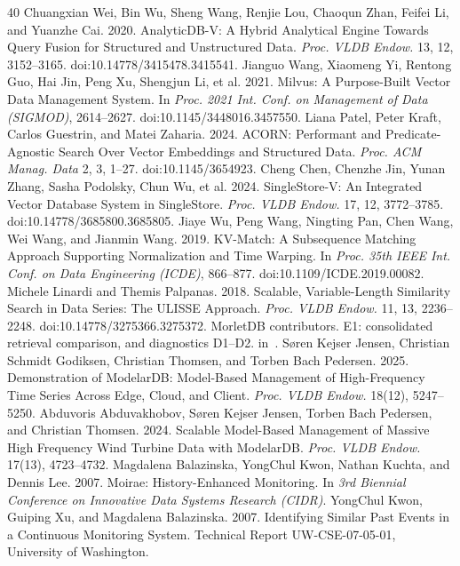 \documentclass[sigconf]{acmart}
\newcommand{\M}{MorletDB}
\begin{document}
\begin{thebibliography}{40}
 Chuangxian Wei, Bin Wu, Sheng Wang, Renjie Lou, Chaoqun Zhan, Feifei Li, and Yuanzhe Cai. 2020. AnalyticDB-V: A Hybrid Analytical Engine Towards Query Fusion for Structured and Unstructured Data. \emph{Proc. VLDB Endow.} 13, 12, 3152--3165. doi:10.14778/3415478.3415541.
 Jianguo Wang, Xiaomeng Yi, Rentong Guo, Hai Jin, Peng Xu, Shengjun Li, et al. 2021. Milvus: A Purpose-Built Vector Data Management System. In \emph{Proc. 2021 Int. Conf. on Management of Data (SIGMOD)}, 2614--2627. doi:10.1145/3448016.3457550.
 Liana Patel, Peter Kraft, Carlos Guestrin, and Matei Zaharia. 2024. ACORN: Performant and Predicate-Agnostic Search Over Vector Embeddings and Structured Data. \emph{Proc. ACM Manag. Data} 2, 3, 1--27. doi:10.1145/3654923.
 Cheng Chen, Chenzhe Jin, Yunan Zhang, Sasha Podolsky, Chun Wu, et al. 2024. SingleStore-V: An Integrated Vector Database System in SingleStore. \emph{Proc. VLDB Endow.} 17, 12, 3772--3785. doi:10.14778/3685800.3685805.
 Jiaye Wu, Peng Wang, Ningting Pan, Chen Wang, Wei Wang, and Jianmin Wang. 2019. KV-Match: A Subsequence Matching Approach Supporting Normalization and Time Warping. In \emph{Proc. 35th IEEE Int. Conf. on Data Engineering (ICDE)}, 866--877. doi:10.1109/ICDE.2019.00082.
 Michele Linardi and Themis Palpanas. 2018. Scalable, Variable-Length Similarity Search in Data Series: The ULISSE Approach. \emph{Proc. VLDB Endow.} 11, 13, 2236--2248. doi:10.14778/3275366.3275372.
 \M{} contributors. E1: consolidated retrieval comparison, and diagnostics D1--D2.  in~\cite{repo}.
 S{\o}ren Kejser Jensen, Christian Schmidt Godiksen, Christian Thomsen, and Torben Bach Pedersen. 2025. Demonstration of ModelarDB: Model-Based Management of High-Frequency Time Series Across Edge, Cloud, and Client. \emph{Proc. VLDB Endow.} 18(12), 5247--5250.
 Abduvoris Abduvakhobov, S{\o}ren Kejser Jensen, Torben Bach Pedersen, and Christian Thomsen. 2024. Scalable Model-Based Management of Massive High Frequency Wind Turbine Data with ModelarDB. \emph{Proc. VLDB Endow.} 17(13), 4723--4732.
 Magdalena Balazinska, YongChul Kwon, Nathan Kuchta, and Dennis Lee. 2007. Moirae: History-Enhanced Monitoring. In \emph{3rd Biennial Conference on Innovative Data Systems Research (CIDR)}.
 YongChul Kwon, Guiping Xu, and Magdalena Balazinska. 2007. Identifying Similar Past Events in a Continuous Monitoring System. Technical Report UW-CSE-07-05-01, University of Washington.

\end{thebibliography}
\end{document}
